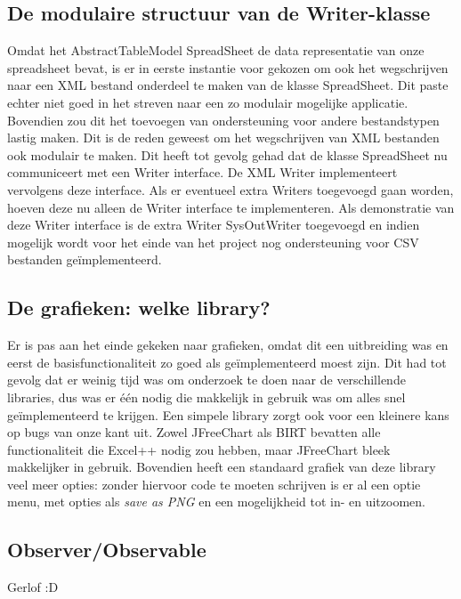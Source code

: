 \documentclass[a4paper,11pt]{article}
\begin{document}
\subsection{De modulaire structuur van de Writer-klasse}
Omdat het AbstractTableModel SpreadSheet de data representatie van onze spreadsheet bevat, is er in eerste instantie voor gekozen om ook het wegschrijven naar een XML bestand onderdeel te maken van de klasse SpreadSheet. Dit paste echter niet goed in het streven naar een zo modulair mogelijke applicatie. Bovendien zou dit het toevoegen van ondersteuning voor andere bestandstypen lastig maken. Dit is de reden geweest om het wegschrijven van XML bestanden ook modulair te maken. Dit heeft tot gevolg gehad dat de klasse SpreadSheet nu communiceert met een Writer interface. De XML Writer implementeert vervolgens deze interface. Als er eventueel extra Writers toegevoegd gaan worden, hoeven deze nu alleen de Writer interface te implementeren. Als demonstratie van deze Writer interface is de extra Writer SysOutWriter toegevoegd en indien mogelijk wordt voor het einde van het project nog ondersteuning voor CSV bestanden geïmplementeerd.

\subsection{De grafieken: welke library?}
Er is pas aan het einde gekeken naar grafieken, omdat dit een uitbreiding was en eerst de basisfunctionaliteit zo goed als geïmplementeerd moest zijn. Dit had tot gevolg dat er weinig tijd was om onderzoek te doen naar de verschillende libraries, dus was er één nodig die makkelijk in gebruik was om alles snel geïmplementeerd te krijgen. Een simpele library zorgt ook voor een kleinere kans op bugs van onze kant uit. Zowel JFreeChart als BIRT bevatten alle functionaliteit die Excel++ nodig zou hebben, maar JFreeChart bleek makkelijker in gebruik. Bovendien heeft een standaard grafiek van deze library veel meer opties: zonder hiervoor code te moeten schrijven is er al een optie menu, met opties als \textit{save as PNG} en een mogelijkheid tot in- en uitzoomen.

\subsection{Observer/Observable}
Gerlof :D
\end{document}
